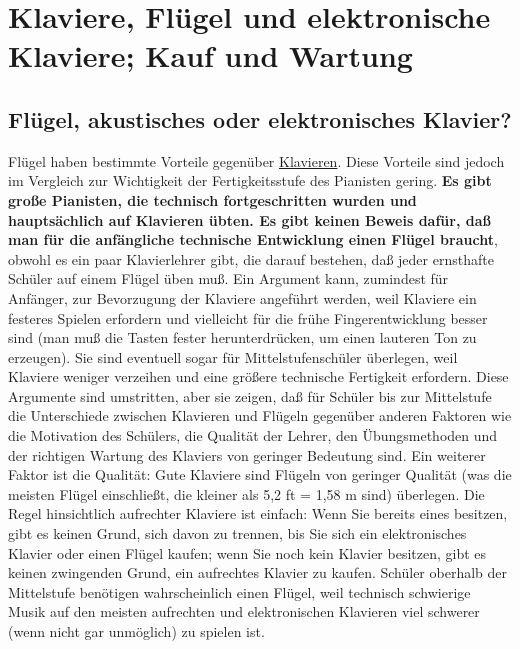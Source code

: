 
\section{Klaviere, Flügel und elektronische Klaviere; Kauf und Wartung}
\label{c1iii17}
 
\subsection{Flügel, akustisches oder elektronisches Klavier?}
\label{c1iii17a}

Flügel haben bestimmte Vorteile gegenüber \hyperref[upright]{Klavieren}.
Diese Vorteile sind jedoch im Vergleich zur Wichtigkeit der Fertigkeitsstufe des Pianisten gering.
\textbf{Es gibt große Pianisten, die technisch fortgeschritten wurden und hauptsächlich auf Klavieren übten.
Es gibt keinen Beweis dafür, daß man für die anfängliche technische Entwicklung einen Flügel braucht}, obwohl es ein paar Klavierlehrer gibt, die darauf bestehen, daß jeder ernsthafte Schüler auf einem Flügel üben muß.
Ein Argument kann, zumindest für Anfänger, zur Bevorzugung der Klaviere angeführt werden, weil Klaviere ein festeres Spielen erfordern und vielleicht für die frühe Fingerentwicklung besser sind (man muß die Tasten fester herunterdrücken, um einen lauteren Ton zu erzeugen).
Sie sind eventuell sogar für Mittelstufenschüler überlegen, weil Klaviere weniger verzeihen und eine größere technische Fertigkeit erfordern.
Diese Argumente sind umstritten, aber sie zeigen, daß für Schüler bis zur Mittelstufe die Unterschiede zwischen Klavieren und Flügeln gegenüber anderen Faktoren wie die Motivation des Schülers, die Qualität der Lehrer, den Übungsmethoden und der richtigen Wartung des Klaviers von geringer Bedeutung sind.
Ein weiterer Faktor ist die Qualität: Gute Klaviere sind Flügeln von geringer Qualität (was die meisten Flügel einschließt, die kleiner als 5,2 ft = 1,58 m sind) überlegen.
Die Regel hinsichtlich aufrechter Klaviere ist einfach: Wenn Sie bereits eines besitzen, gibt es keinen Grund, sich davon zu trennen, bis Sie sich ein elektronisches Klavier oder einen Flügel kaufen; wenn Sie noch kein Klavier besitzen, gibt es keinen zwingenden Grund, ein aufrechtes Klavier zu kaufen.
Schüler oberhalb der Mittelstufe benötigen wahrscheinlich einen Flügel, weil technisch schwierige Musik auf den meisten aufrechten und elektronischen Klavieren viel schwerer (wenn nicht gar unmöglich) zu spielen ist.

